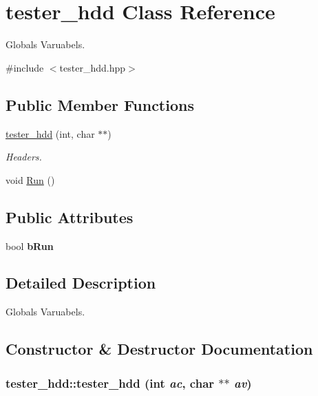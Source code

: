 \hypertarget{classtester__hdd}{
\section{tester\_\-hdd Class Reference}
\label{classtester__hdd}
}


Globals Varuabels.  




{\ttfamily \#include $<$tester\_\-hdd.hpp$>$}

\subsection*{Public Member Functions}
\begin{DoxyCompactItemize}
\item 
\hyperlink{classtester__hdd_af43b8ca9595ed8ebf14b2c7cffe561c2}{tester\_\-hdd} (int, char $\ast$$\ast$)
\begin{DoxyCompactList}\small\item\em Headers. \item\end{DoxyCompactList}\item 
void \hyperlink{classtester__hdd_abfdcc395e8be504dfd0ea686da790375}{Run} ()
\end{DoxyCompactItemize}
\subsection*{Public Attributes}
\begin{DoxyCompactItemize}
\item 
\hypertarget{classtester__hdd_a71413f3e5b1ecf13efe4eb8c9064a211}{
bool {\bfseries bRun}}
\label{classtester__hdd_a71413f3e5b1ecf13efe4eb8c9064a211}

\end{DoxyCompactItemize}


\subsection{Detailed Description}
Globals Varuabels. 

\subsection{Constructor \& Destructor Documentation}
\hypertarget{classtester__hdd_af43b8ca9595ed8ebf14b2c7cffe561c2}{
\subsubsection[{tester\_\-hdd}]{\setlength{\rightskip}{0pt plus 5cm}tester\_\-hdd::tester\_\-hdd (int {\em ac}, \/  char $\ast$$\ast$ {\em av})}}
\label{classtester__hdd_af43b8ca9595ed8ebf14b2c7cffe561c2}


